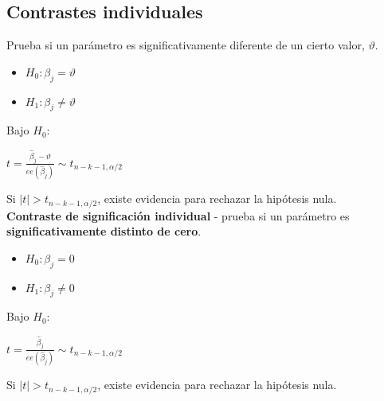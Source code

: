 \documentclass[10pt, a4paper, landscape]{extarticle}
\begin{document}
\begin{multicols}{3}
	\subsection*{Contrastes individuales}
		Prueba si un parámetro es significativamente diferente de un cierto valor, $\vartheta$.
		\begin{itemize}[leftmargin=*]
			\item $H_0: \beta_j = \vartheta$
			\item $H_1: \beta_j \neq \vartheta$
		\end{itemize}
		Bajo $H_0$:
		\begin{center}
			$t = \frac{\hat{\beta}_j - \vartheta}{ee(\hat{\beta}_j)} \sim t_{n-k-1, \alpha/2}$
		\end{center}
		Si $\mid t \mid > t_{n-k-1, \alpha/2}$, existe evidencia para rechazar la hipótesis nula.
		\\ \textbf{Contraste de significación individual} - prueba si un parámetro es \textbf{significativamente distinto de cero}.
		\begin{itemize}[leftmargin=*]
			\item $H_0: \beta_j = 0$
			\item $H_1: \beta_j \neq 0$
		\end{itemize}
		Bajo $H_0$:
		\begin{center}
			$t = \frac{\hat{\beta}_j}{ee(\hat{\beta}_j)} \sim t_{n-k-1, \alpha/2}$
		\end{center}
		Si $\mid t \mid > t_{n-k-1, \alpha/2}$, existe evidencia para rechazar la hipótesis nula.

\end{multicols}
\end{document}
